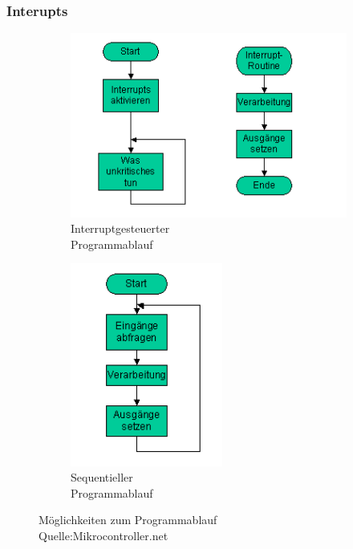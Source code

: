 \documentclass[a4paper, 11pt]{scrartcl}
\begin{document}
		\subsubsection{Interupts}
		\begin{figure}[h]
			\centering
			\begin{subfigure}{0.47\textwidth}
				\centering
				\includegraphics[width=1.1\textwidth]{bilder/Interrupt_Programme.png}
				\caption{Interruptgesteuerter \\Programmablauf}
				\label{InterruptgesteuerterProgrammablauf}		
			\end{subfigure}
			\begin{subfigure}{0.47\textwidth}
				\centering
				\includegraphics[width=0.55\textwidth]{bilder/Sequentielle_Programme.png}
				\caption{Sequentieller \\Programmablauf}
				\label{SequentiellerProgrammablauf}
			\end{subfigure}
			\caption[Möglichkeiten zum Programmablauf]{Möglichkeiten zum Programmablauf
			\\Quelle:Mikrocontroller.net}
			\label{Programmablauf}
		\end{figure}
\end{document}
